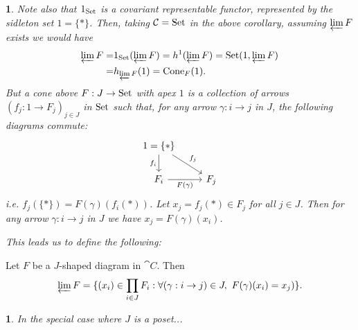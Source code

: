 \documentclass[12pt]{article}
\newtheorem{para}[theorem]{}
\begin{document}
\begin{para}
	Note also that $1_{\text{Set}}$ is a covariant representable functor, represented by the sidleton set $1=\{\ast\}$. Then, taking $\mathcal{C}=\text{Set}$ in the above corollary, assuming $\varprojlim F$ exists we would have 
	\begin{align*}
		\varprojlim F =& 1_{\text{Set}}(\varprojlim F) = h^1(\varprojlim F) = \text{Set}(1, \varprojlim F) \\
		=& h_{\varprojlim F}(1) = \text{Cone}_F(1).
	\end{align*}
	But a cone above $F:J\to\text{Set}$ with apex $1$ is a collection of arrows $(f_j: 1\to F_j)_{j\in J}$ in $\text{Set}$ such that, for any arrow $\gamma: i\to j$ in $J$, the following diagrams commute:
	\begin{equation*}
\begin{tikzcd}
1=\{\ast\} \arrow[d, "f_i"'] \arrow[rd, "f_j"] &     \\
F_i \arrow[r, "F(\gamma)"']                    & F_j
\end{tikzcd}
	\end{equation*}
	i.e. $f_j(\{\ast\})=F(\gamma)(f_i(\ast))$. Let $x_j=f_j(\ast)\in F_j$ for all $j\in J$. Then for any arrow $\gamma:i\to j$ in $J$ we have $x_j=F(\gamma)(x_i)$.

	This leads us to define the following:
\end{para}

\begin{theorem}
	Let $F$ be a $J$-shaped diagram in $\cat{C}$. Then 
	\begin{equation*}
		\varprojlim F = \{ (x_i)\in\prod_{i\in J} F_i : \forall (\gamma: i\to j)\in J,\ F(\gamma)(x_i)=x_j) \}.
	\end{equation*}
\end{theorem}

\begin{para}
	In the special case where $J$ is a poset...
\end{para}
\end{document}
